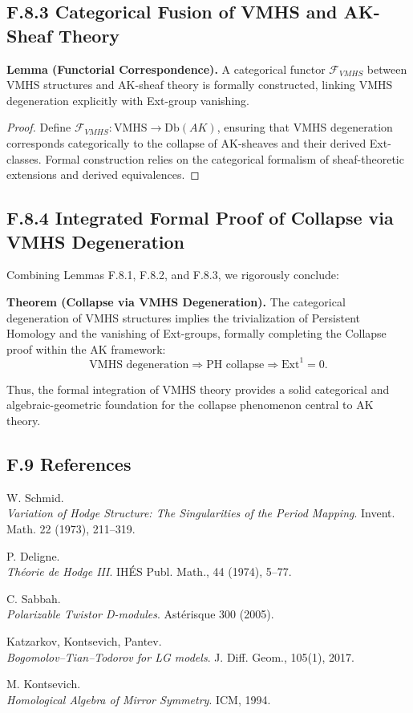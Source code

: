 \documentclass[11pt]{article}
\begin{document}
\subsection*{F.8.3 Categorical Fusion of VMHS and AK-Sheaf Theory}
\textbf{Lemma (Functorial Correspondence).}  
A categorical functor \( \mathcal{F}_{VMHS} \) between VMHS structures and AK-sheaf theory is formally constructed, linking VMHS degeneration explicitly with Ext-group vanishing.

\begin{proof}
Define \( \mathcal{F}_{VMHS}: \text{VMHS} \rightarrow \text{Db}(AK) \), ensuring that VMHS degeneration corresponds categorically to the collapse of AK-sheaves and their derived Ext-classes. Formal construction relies on the categorical formalism of sheaf-theoretic extensions and derived equivalences.
\end{proof}

\subsection*{F.8.4 Integrated Formal Proof of Collapse via VMHS Degeneration}
Combining Lemmas F.8.1, F.8.2, and F.8.3, we rigorously conclude:

\textbf{Theorem (Collapse via VMHS Degeneration).}  
The categorical degeneration of VMHS structures implies the trivialization of Persistent Homology and the vanishing of Ext-groups, formally completing the Collapse proof within the AK framework:
\[
\text{VMHS degeneration} \Longrightarrow \text{PH collapse} \Longrightarrow \text{Ext}^1 = 0.
\]

Thus, the formal integration of VMHS theory provides a solid categorical and algebraic-geometric foundation for the collapse phenomenon central to AK theory.



\subsection*{F.9 References}

\begin{thebibliography}{9}

W. Schmid.\\
\textit{Variation of Hodge Structure: The Singularities of the Period Mapping}.  
Invent. Math. 22 (1973), 211–319.

P. Deligne.\\
\textit{Théorie de Hodge III}.  
IHÉS Publ. Math., 44 (1974), 5–77.

C. Sabbah.\\
\textit{Polarizable Twistor D-modules}.  
Astérisque 300 (2005).

Katzarkov, Kontsevich, Pantev.\\
\textit{Bogomolov–Tian–Todorov for LG models}.  
J. Diff. Geom., 105(1), 2017.

M. Kontsevich.\\
\textit{Homological Algebra of Mirror Symmetry}.  
ICM, 1994.

\end{thebibliography}
\end{document}
